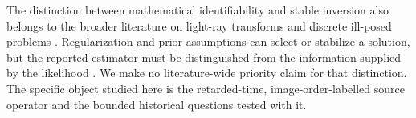 The distinction between mathematical identifiability and stable inversion also belongs to the broader literature on light-ray transforms and discrete ill-posed problems \cite{lassas,hansen}. Regularization and prior assumptions can select or stabilize a solution, but the reported estimator must be distinguished from the information supplied by the likelihood \cite{stuart}. We make no literature-wide priority claim for that distinction. The specific object studied here is the retarded-time, image-order-labelled source operator and the bounded historical questions tested with it.
